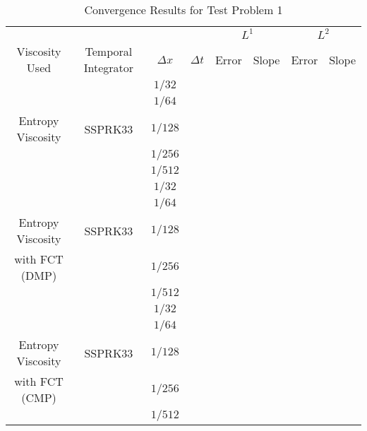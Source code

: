 \documentclass{report}
\begin{document}
\begin{table}[H]\caption{\label{prob1}Convergence Results for Test Problem 1}
\begin{center}
\begin{tabular}{c|c|c|c||c|c|c|c}\hline\hline
& & & & \multicolumn{2}{c}{$L^1$} & \multicolumn{2}{|c}{$L^2$}\\ \cline{5-8}
Viscosity Used         & Temporal Integrator & $\Delta x$ & $\Delta t$ & Error & Slope & Error & Slope \\ \hline\hline
                       &                     & $1/32$     &            &       &       &       &       \\
                       &                     & $1/64$     &            &       &       &       &       \\
Entropy Viscosity      & SSPRK33             & $1/128$    &            &       &       &       &       \\
                       &                     & $1/256$    &            &       &       &       &       \\
                       &                     & $1/512$    &            &       &       &       &       \\ \hline
                       &                     & $1/32$     &            &       &       &       &       \\
                       &                     & $1/64$     &            &       &       &       &       \\
Entropy Viscosity      & SSPRK33             & $1/128$    &            &       &       &       &       \\
with FCT (DMP)         &                     & $1/256$    &            &       &       &       &       \\
                       &                     & $1/512$    &            &       &       &       &       \\ \hline
                       &                     & $1/32$     &            &       &       &       &       \\
                       &                     & $1/64$     &            &       &       &       &       \\
Entropy Viscosity      & SSPRK33             & $1/128$    &            &       &       &       &       \\
with FCT (CMP)         &                     & $1/256$    &            &       &       &       &       \\
                       &                     & $1/512$    &            &       &       &       &       \\ \hline\hline
\end{tabular}
\end{center}
\end{table}
\end{document}
